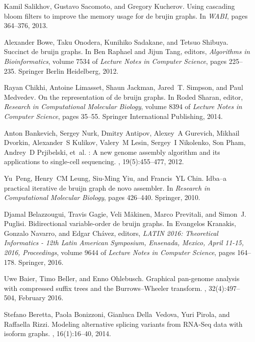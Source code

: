 \documentclass[11pt,oneside,a4paper]{article}
\begin{document}
\begin{thebibliography}{10}
Kamil Salikhov, Gustavo Sacomoto, and Gregory Kucherov.
\newblock Using cascading bloom filters to improve the memory usage for de
  brujin graphs.
\newblock In {\em {WABI}}, pages 364--376, 2013.

Alexander Bowe, Taku Onodera, Kunihiko Sadakane, and Tetsuo Shibuya.
\newblock Succinct de bruijn graphs.
\newblock In Ben Raphael and Jijun Tang, editors, {\em Algorithms in
  Bioinformatics}, volume 7534 of {\em Lecture Notes in Computer Science},
  pages 225--235. Springer Berlin Heidelberg, 2012.

Rayan Chikhi, Antoine Limasset, Shaun Jackman, Jared~T. Simpson, and Paul
  Medvedev.
\newblock On the representation of de bruijn graphs.
\newblock In Roded Sharan, editor, {\em Research in Computational Molecular
  Biology}, volume 8394 of {\em Lecture Notes in Computer Science}, pages
  35--55. Springer International Publishing, 2014.

Anton Bankevich, Sergey Nurk, Dmitry Antipov, Alexey~A Gurevich, Mikhail
  Dvorkin, Alexander~S Kulikov, Valery~M Lesin, Sergey~I Nikolenko, Son Pham,
  Andrey~D Prjibelski, et~al.
: A new genome assembly algorithm and its applications to
  single-cell sequencing.
, 19(5):455--477, 2012.

Yu~Peng, Henry~CM Leung, Siu-Ming Yiu, and Francis~YL Chin.
\newblock Idba--a practical iterative de bruijn graph de novo assembler.
\newblock In {\em Research in Computational Molecular Biology}, pages 426--440.
  Springer, 2010.

Djamal Belazzougui, Travis Gagie, Veli M{\"{a}}kinen, Marco Previtali, and
  Simon~J. Puglisi.
\newblock Bidirectional variable-order de bruijn graphs.
\newblock In Evangelos Kranakis, Gonzalo Navarro, and Edgar Ch{\'{a}}vez,
  editors, {\em {LATIN} 2016: Theoretical Informatics - 12th Latin American
  Symposium, Ensenada, Mexico, April 11-15, 2016, Proceedings}, volume 9644 of
  {\em Lecture Notes in Computer Science}, pages 164--178. Springer, 2016.

Uwe Baier, Timo Beller, and Enno Ohlebusch.
\newblock Graphical pan-genome analysis with compressed suffix trees and the
  {Burrows}–{Wheeler} transform.
, 32(4):497--504, February 2016.

Stefano Beretta, Paola Bonizzoni, Gianluca Della~Vedova, Yuri Pirola, and
  Raffaella Rizzi.
\newblock Modeling alternative splicing variants from {RNA-Seq} data with
  isoform graphs.
, 16(1):16--40, 2014.

\end{thebibliography}
\end{document}
